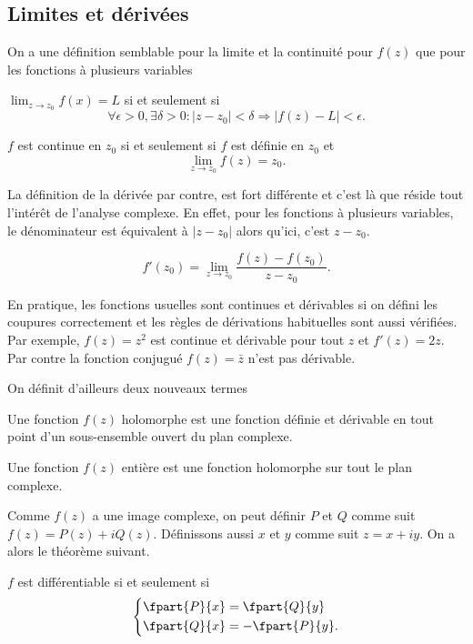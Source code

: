 \subsection{Limites et dérivées}
On a une définition semblable pour la limite et la continuité
pour $f(z)$ que pour les fonctions à plusieurs variables
\begin{mydef}[Limite]
  $\lim_{z\to z_0} f(x) = L$ si et seulement si
  \[ \forall \epsilon>0, \exists\delta>0:
  |z-z_0|<\delta \Rightarrow |f(z)-L|<\epsilon. \]
\end{mydef}
\begin{mydef}[Continuité]
  $f$ est continue en $z_0$ si et seulement si $f$ est définie en $z_0$ et
  \[ \lim_{z \to z_0} f(z) = z_0. \]
\end{mydef}

La définition de la dérivée par contre, est fort différente
et c'est là que réside tout l'intérêt de l'analyse complexe.
En effet, pour les fonctions à plusieurs variables, le dénominateur est
équivalent à $|z - z_0|$ alors qu'ici, c'est $z - z_0$.
\begin{mydef}
  \[ f'(z_0) = \lim_{z \to z_0} \frac{f(z) - f(z_0)}{z - z_0}. \]
\end{mydef}

En pratique, les fonctions usuelles sont continues et dérivables si
on défini les coupures correctement et les règles de dérivations
habituelles sont aussi vérifiées.
Par exemple, $f(z) = z^2$ est continue et dérivable pour tout $z$ et
$f'(z) = 2z$.
Par contre la fonction conjugué $f(z) = \bar{z}$ n'est pas dérivable.

On définit d'ailleurs deux nouveaux termes
\begin{mydef}
  Une fonction $f(z)$ holomorphe est une fonction définie et dérivable
  en tout point d'un sous-ensemble ouvert du plan complexe.
\end{mydef}
\begin{mydef}
  Une fonction $f(z)$ entière est une fonction holomorphe sur tout
  le plan complexe.
\end{mydef}

Comme $f(z)$ a une image complexe,
on peut définir $P$ et $Q$ comme suit $f(z) = P(z) + iQ(z)$.
Définissons aussi $x$ et $y$ comme suit $z = x + iy$.
On a alors le théorème suivant.
\begin{mytheo}
  $f$ est différentiable si et seulement si
  \[ \left\{\begin{aligned}
      \fpart{P}{x} & = \fpart{Q}{y}\\
      \fpart{Q}{x} & = -\fpart{P}{y}.
  \end{aligned}\right. \]
\end{mytheo}

